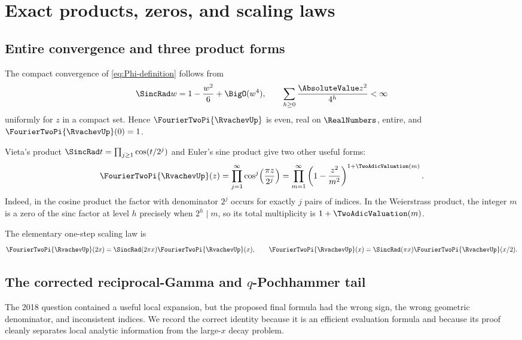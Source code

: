 \documentclass[11pt,oneside]{article}
\numberwithin{equation}{section}
\theoremstyle{definition}
\theoremstyle{remark}
\begin{document}
\section{Exact products, zeros, and scaling laws}
\label{sec:exact-products}

\subsection{Entire convergence and three product forms}

The compact convergence of \eqref{eq:Phi-definition} follows from
\[
 \SincRad w=1-\frac{w^2}{6}+\BigO(w^4),
 \qquad
 \sum_{h\ge0}\frac{\AbsoluteValue z^2}{4^h}<\infty
\]
uniformly for $z$ in a compact set.  Hence $\FourierTwoPi{\RvachevUp}$ is even, real on $\RealNumbers$, entire, and
$\FourierTwoPi{\RvachevUp}(0)=1$.

Vieta's product $\SincRad t=\prod_{j\ge1}\cos(t/2^j)$ and Euler's sine product give two other
useful forms:
\begin{equation}
 \FourierTwoPi{\RvachevUp}(z)
 =\prod_{j=1}^{\infty}\cos^j\!\left(\frac{\pi z}{2^j}\right)
 =\prod_{m=1}^{\infty}
   \left(1-\frac{z^2}{m^2}\right)^{1+\TwoAdicValuation(m)}.
 \label{eq:three-products}
\end{equation}
Indeed, in the cosine product the factor with denominator $2^j$ occurs for exactly $j$
pairs of indices.  In the Weierstrass product, the integer $m$ is a zero of the sinc factor
at level $h$ precisely when $2^h\mid m$, so its total multiplicity is $1+\TwoAdicValuation(m)$.

The elementary one-step scaling law is
\begin{equation}
 \FourierTwoPi{\RvachevUp}(2x)=\SincRad(2\pi x)\FourierTwoPi{\RvachevUp}(x),
 \qquad
 \FourierTwoPi{\RvachevUp}(x)=\SincRad(\pi x)\FourierTwoPi{\RvachevUp}(x/2).
 \label{eq:one-step-scaling}
\end{equation}

\subsection{The corrected reciprocal-Gamma and \texorpdfstring{$q$}{q}-Pochhammer tail}
\label{subsec:pochhammer-tail}

The 2018 question contained a useful local expansion, but the proposed final formula had
the wrong sign, the wrong geometric denominator, and inconsistent indices.  We record the
correct identity because it is an efficient evaluation formula and because its proof cleanly
separates local analytic information from the large-$x$ decay problem.
\end{document}
